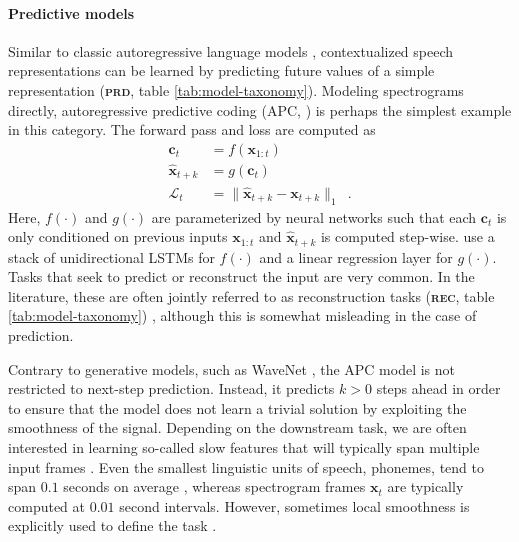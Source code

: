 {\paragraph{Predictive models}
Similar to classic autoregressive language models \cite{mikolov_recurrent_2010}, contextualized speech representations can be learned by predicting future values of a simple representation \cite{oord_representation_2018, chung_unsupervised_2019, schneider_wav2vec_2019, chung_generative_2020, jiang_further_2021} (\textbf{\textsc{prd}}, table \ref{tab:model-taxonomy}). Modeling spectrograms directly, autoregressive predictive coding (APC, \citealp{chung_unsupervised_2019}) is perhaps the simplest example in this category. The forward pass and loss are computed as
\begin{align}
    \mathbf{c}_{t} &= f(\mathbf{x}_{1:t})  \label{eq_brief:apc_f} \\ 
    \hat{\mathbf{x}}_{t+k} &= g(\mathbf{c}_{t}) \\
    \mathcal{L}_t &= \lVert \hat{\mathbf{x}}_{t+k} - \mathbf{x}_{t+k} \rVert_1\enspace.
\end{align}
%
\noindent Here, $f(\cdot)$ and $g(\cdot)$ are parameterized by neural networks such that each $\mathbf{c}_t$ is only conditioned on previous inputs $\mathbf{x}_{1:t}$ and $\hat{\mathbf{x}}_{t+k}$ is computed step-wise. \citet{chung_unsupervised_2019} use a stack of unidirectional LSTMs for $f(\cdot)$ and a linear regression layer for $g(\cdot)$. Tasks that seek to predict or reconstruct the input are very common. In the literature, these are often jointly referred to as reconstruction tasks (\textbf{\textsc{rec}}, table \ref{tab:model-taxonomy}) \cite{liu_tera_2021, wang_unispeech_2021}, although this is somewhat misleading in the case of prediction.

Contrary to generative models, such as WaveNet \cite{oord_wavenet_2016}, the APC model is not restricted to next-step prediction. Instead, it predicts $k > 0$ steps ahead in order to ensure that the model does not learn a trivial solution by exploiting the smoothness of the signal. Depending on the downstream task, we are often interested in learning so-called slow features that will typically span multiple input frames \cite{wiskott_slow_2002}. Even the smallest linguistic units of speech, phonemes, tend to span $0.1$ seconds on average \cite{garofolo_timit_1993}, whereas spectrogram frames $\mathbf{x}_t$ are typically computed at $0.01$ second intervals. However, sometimes local smoothness is explicitly used to define the task \cite{badino_autoencoder_2014, jati_speaker2vec_2017, jati_neural_2019}.

}
